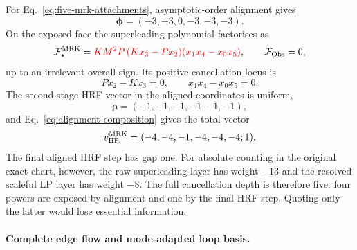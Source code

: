 \documentclass[a4paper,11pt]{article}
\newcommand{\FObs}{\mathcal F_{\rm Obs}}
\newcommand{\vHR}{\vec v_{\rm HR}}
\newcommand{\SLcolour}[1]{{\color{red}#1}}
\begin{document}
For Eq.~\eqref{eq:five-mrk-attachments}, asymptotic-order alignment gives
\begin{equation}
 \boldsymbol\phi=(-3,-3,0,-3,-3,-3).
 \label{eq:five-mrk-alignment-vector}
\end{equation}
On the exposed face the superleading polynomial factorises as
\begin{equation}
 \mathcal F_\star^{\rm MRK}
 =\SLcolour{KM^2P\,(Kx_3-Px_2)(x_1x_4-x_0x_5)},
 \qquad \FObs=0,
 \label{eq:five-mrk-aligned-polynomial}
\end{equation}
up to an irrelevant overall sign.  Its positive cancellation locus is
\begin{equation}
 Px_2-Kx_3=0,\qquad x_1x_4-x_0x_5=0.
 \label{eq:five-mrk-cancellation-locus}
\end{equation}
The second-stage HRF vector in the aligned coordinates is uniform,
\begin{equation}
 \boldsymbol\rho=(-1,-1,-1,-1,-1,-1),
 \label{eq:five-mrk-second-vector}
\end{equation}
and Eq.~\eqref{eq:alignment-composition} gives the total vector
\begin{equation}
 \vHR^{\rm MRK}=(-4,-4,-1,-4,-4,-4;1).
 \label{eq:five-mrk-total-vector}
\end{equation}
The final aligned HRF step has gap one.  For absolute counting in the
original exact chart, however, the raw superleading layer has weight \(-13\)
and the resolved scaleful LP layer has weight \(-8\).  The full cancellation
depth is therefore five: four powers are exposed by alignment and one by the
final HRF step.  Quoting only the latter would lose essential information.

\paragraph{Complete edge flow and mode-adapted loop basis.}
\end{document}
